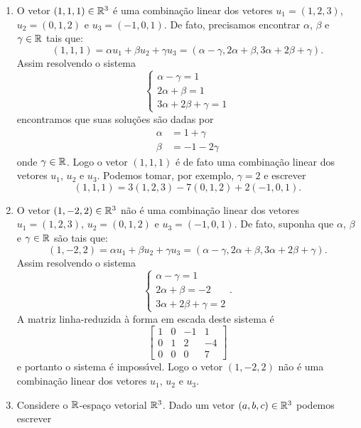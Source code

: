 \begin{exemplo}
	\begin{enumerate}
		\item O vetor $(1, 1, 1) \in \mathbb{R}^3$ \'e uma combina\c{c}\~ao linear dos vetores $u_1 = (1, 2, 3)$, $u_2 = (0, 1, 2)$ e $u_3 = (-1, 0, 1)$. De fato, precisamos encontrar $\alpha$, $\beta$ e $\gamma \in \mathbb{R}$ tais que:
		\[
			(1, 1, 1) = \alpha u_1 + \beta u_2 + \gamma u_3 = (\alpha - \gamma, 2\alpha + \beta, 3\alpha + 2\beta + \gamma).
		\]
		Assim resolvendo o sistema
		\[
		\begin{cases}
			\alpha - \gamma = 1\\
			2\alpha + \beta = 1\\
			3\alpha + 2\beta + \gamma = 1
		\end{cases}
		\]
		encontramos que suas solu\c{c}\~oes s\~ao dadas por
		\begin{align*}
			\alpha &= 1 + \gamma\\
			\beta &= -1 - 2\gamma
		\end{align*}
		onde $\gamma \in \mathbb{R}$. Logo o vetor $(1, 1, 1)$ \'e de fato uma combina\c{c}\~ao linear dos vetores $u_1$, $u_2$ e $u_3$. Podemos tomar, por exemplo, $\gamma = 2$ e escrever
		\[
			(1, 1, 1) = 3(1, 2, 3) -7(0, 1, 2) + 2(-1, 0 , 1).
		\]
		\item O vetor $(1, -2, 2) \in \mathbb{R}^3$ n\~ao \'e uma combina\c{c}\~ao linear dos vetores $u_1 = (1, 2, 3)$, $u_2 = (0, 1, 2)$ e $u_3 = (-1, 0, 1)$. De fato, suponha que $\alpha$, $\beta$ e $\gamma \in \mathbb{R}$ s\~ao tais que:
		\[
			(1, -2, 2) = \alpha u_1 + \beta u_2 + \gamma u_3 = (\alpha - \gamma, 2\alpha + \beta, 3\alpha + 2\beta + \gamma).
		\]
		Assim resolvendo o sistema
		\[
		\begin{cases}
			\alpha - \gamma = 1\\
			2\alpha + \beta = -2\\
			3\alpha + 2\beta + \gamma = 2
		\end{cases}.
		\]
		A matriz linha-reduzida \`a forma em escada deste sistema \'e
		\[
			\begin{bmatrix}
				1 & 0 & -1 & 1\\
				0 & 1 & 2 & -4\\
				0 & 0 & 0 & 7
			\end{bmatrix}
		\]
		e portanto o sistema \'e imposs{\'\i}vel. Logo o vetor $(1, -2, 2)$ n\~ao \'e uma combina\c{c}\~ao linear dos vetores $u_1$, $u_2$ e $u_3$.
	\item Considere o $\mathbb{R}$-espa\c{c}o vetorial $\mathbb{R}^3$. Dado um vetor $(a, b, c) \in \mathbb{R}^3$ podemos escrever

\end{enumerate}
\end{exemplo}
